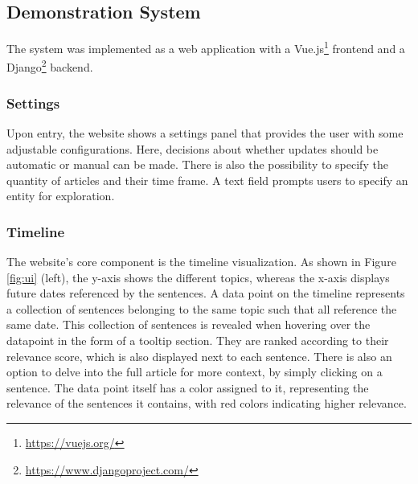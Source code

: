 \documentclass[sigconf]{acmart}
\begin{document}
\subsection{Demonstration System}
The system was implemented as a web application with a Vue.js\footnote{\url{https://vuejs.org/}} frontend and a Django\footnote{\url{https://www.djangoproject.com/}} backend. 


\subsubsection{Settings}
Upon entry, the website shows a settings panel that provides the user with some adjustable configurations. Here, decisions about whether updates should be automatic or manual can be made. There is also the possibility to specify the quantity of articles and their time frame. A text field prompts users to specify an entity for exploration.


\subsubsection{Timeline}
The website's core component is the timeline visualization. As shown in Figure \ref{fig:ui} (left), the y-axis shows the different topics, whereas the x-axis displays future dates referenced by the sentences. A data point on the timeline represents a collection of sentences belonging to the same topic such that all reference the same date. This collection of sentences is revealed when hovering over the datapoint in the form of a tooltip section. They are ranked according to their relevance score, which is also displayed next to each sentence. There is also an option to delve into the full article for more context, by simply clicking on a sentence. The data point itself has a color assigned to it, representing the relevance of the sentences it contains, with red colors indicating higher relevance.
\end{document}
